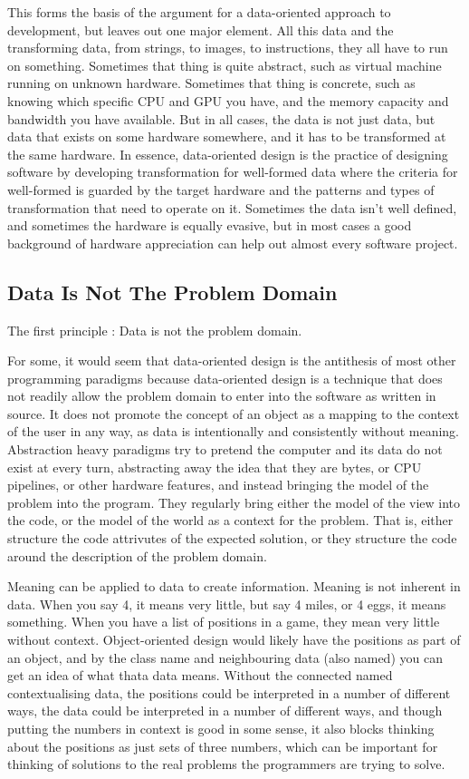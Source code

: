 \documentclass[a4paper,12pt]{book}
\begin{document}
This forms the basis of the argument for a data-oriented approach to development, but leaves out one major element.
All this data and the transforming data, from strings, to images, to instructions, they all have to run on something.
Sometimes that thing is quite abstract, such as virtual machine running on unknown hardware.
Sometimes that thing is concrete, such as knowing which specific CPU and GPU you have, and the memory capacity and bandwidth you have available.
But in all cases, the data is not just data, but data that exists on some hardware somewhere, and it has to be transformed at the same hardware.
In essence, data-oriented design is the practice of designing software by developing transformation for well-formed data where the criteria for well-formed is guarded by the target hardware and the patterns and types of transformation that need to operate on it.
Sometimes the data isn't well defined, and sometimes the hardware is equally evasive, but in most cases a good background of hardware appreciation can help out almost every software project.

\subsection{Data Is Not The Problem Domain}

The first principle : Data is not the problem domain.

For some, it would seem that data-oriented design is the antithesis of most other programming paradigms because data-oriented design is a technique that does not readily allow the problem domain to enter into the software as written in source.
It does not promote the concept of an object as a mapping to the context of the user in any way, as data is intentionally and consistently without meaning.
Abstraction heavy paradigms try to pretend the computer and its data do not exist at every turn, abstracting away the idea that they are bytes, or CPU pipelines, or other hardware features, and instead bringing the model of the problem into the program.
They regularly bring either the model of the view into the code, or the model of the world as a context for the problem.
That is, either structure the code attrivutes of the expected solution, or they structure the code around the description of the problem domain.

Meaning can be applied to data to create information.
Meaning is not inherent in data.
When you say 4, it means very little, but say 4 miles, or 4 eggs, it means something.
When you have a list of positions in a game, they mean very little without context. Object-oriented design would likely have the positions as part of an object, and by the class name and neighbouring data (also named) you can get an idea of what thata data means.
Without the connected named contextualising data, the positions could be interpreted in a number of different ways, the data could be interpreted in a number of different ways, and though putting the numbers in context is good in some sense, it also blocks thinking about the positions as just sets of three numbers, which can be important for thinking of solutions to the real problems the programmers are trying to solve.
\end{document}
